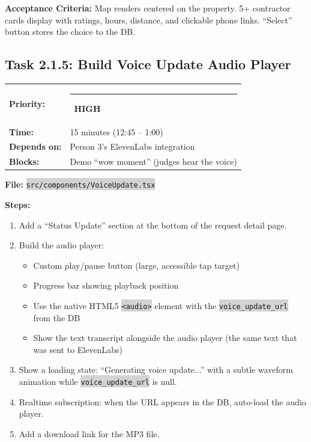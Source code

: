 \documentclass[11pt, a4paper]{article}
\newcommand{\highpri}{\textcolor{highamber}{\rule{6pt}{6pt}}~\textcolor{highamber}{\scriptsize\textbf{HIGH}}}
\newcommand{\code}[1]{\texttt{\small\colorbox{lightgray}{#1}}}
\begin{document}
\textbf{Acceptance Criteria:} Map renders centered on the property. 5+ contractor cards display with ratings, hours, distance, and clickable phone links. ``Select'' button stores the choice to the DB.

\vspace{1em}

\subsection{Task 2.1.5: Build Voice Update Audio Player}

\begin{tabularx}{\textwidth}{lX}
\textbf{Priority:} & \highpri \\
\textbf{Time:} & 15 minutes (12:45 -- 1:00) \\
\textbf{Depends on:} & Person 3's ElevenLabs integration \\
\textbf{Blocks:} & Demo ``wow moment'' (judges hear the voice) \\
\end{tabularx}

\vspace{0.3em}

\textbf{File:} \code{src/components/VoiceUpdate.tsx}

\textbf{Steps:}
\begin{enumerate}[leftmargin=2em, itemsep=2pt]
  \item Add a ``Status Update'' section at the bottom of the request detail page.
  \item Build the audio player:
    \begin{itemize}[itemsep=1pt]
      \item Custom play/pause button (large, accessible tap target)
      \item Progress bar showing playback position
      \item Use the native HTML5 \code{<audio>} element with the \code{voice\_update\_url} from the DB
      \item Show the text transcript alongside the audio player (the same text that was sent to ElevenLabs)
    \end{itemize}
  \item Show a loading state: ``Generating voice update...'' with a subtle waveform animation while \code{voice\_update\_url} is null.
  \item Realtime subscription: when the URL appears in the DB, auto-load the audio player.
  \item Add a download link for the MP3 file.
\end{enumerate}
\end{document}
